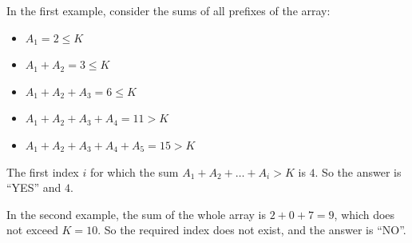 In the first example, consider the sums of all prefixes of the array:

\begin{itemize}
\item $A_1 = 2 \le K$
\item $A_1 + A_2 = 3 \le K$
\item $A_1 + A_2 + A_3 = 6 \le K$
\item $A_1 + A_2 + A_3 + A_4 = 11 > K$
\item $A_1 + A_2 + A_3 + A_4 + A_5 = 15 > K$
\end{itemize}

The first index $i$ for which the sum $A_1 + A_2 + \ldots + A_i > K$ is $4$. So the answer is ``YES'' and $4$.

In the second example, the sum of the whole array is $2 + 0 + 7 = 9$, which does not exceed $K = 10$. So the required index does not exist, and the answer is ``NO''.